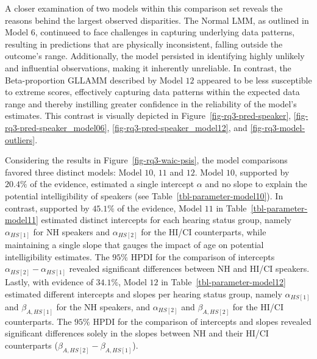 \documentclass[
  authoryear,
  preprint,
  1p]{elsarticle}
\begin{document}
A closer examination of two models within this comparison set reveals
the reasons behind the largest observed disparities. The Normal LMM, as
outlined in Model \(6\), continueed to face challenges in capturing
underlying data patterns, resulting in predictions that are physically
inconsistent, falling outside the outcome's range. Additionally, the
model persisted in identifying highly unlikely and influential
observations, making it inherently unreliable. In contrast, the
Beta-proportion GLLAMM described by Model \(12\) appeared to be less
susceptible to extreme scores, effectively capturing data patterns
within the expected data range and thereby instilling greater confidence
in the reliability of the model's estimates. This contrast is visually
depicted in Figure~\ref{fig-rq3-pred-speaker},
\ref{fig-rq3-pred-speaker_model06}, \ref{fig-rq3-pred-speaker_model12},
and \ref{fig-rq3-model-outliers}.

Considering the results in Figure~\ref{fig-rq3-waic-psis}, the model
comparisons favored three distinct models: Model \(10\), \(11\) and
\(12\). Model \(10\), supported by \(20.4\%\) of the evidence, estimated
a single intercept \(\alpha\) and no slope to explain the potential
intelligibility of speakers (see Table~\ref{tbl-parameter-model10}). In
contrast, supported by \(45.1\%\) of the evidence, Model \(11\) in
Table~\ref{tbl-parameter-model11} estimated distinct intercepts for each
hearing status group, namely \(\alpha_{HS[1]}\) for NH speakers and
\(\alpha_{HS[2]}\) for the HI/CI counterparts, while maintaining a
single slope that gauges the impact of age on potential intelligibility
estimates. The \(95\%\) HPDI for the comparison of intercepts
\(\alpha_{HS[2]}-\alpha_{HS[1]}\) revealed significant differences
between NH and HI/CI speakers. Lastly, with evidence of \(34.1\%\),
Model \(12\) in Table~\ref{tbl-parameter-model12} estimated different
intercepts and slopes per hearing status group, namely
\(\alpha_{HS[1]}\) and \(\beta_{A,HS[1]}\) for the NH speakers, and
\(\alpha_{HS[2]}\) and \(\beta_{A,HS[2]}\) for the HI/CI counterparts.
The \(95\%\) HPDI for the comparison of intercepts and slopes revealed
significant differences solely in the slopes between NH and their HI/CI
counterparts (\(\beta_{A,HS[2]}-\beta_{A,HS[1]}\)).
\end{document}
